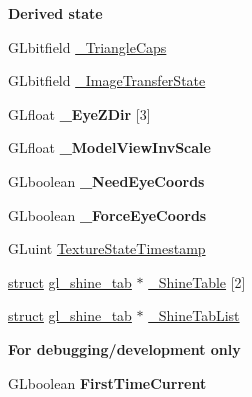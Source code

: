 \begin{Indent}\textbf{ Derived state}\par
\begin{DoxyCompactItemize}
\item 
G\+Lbitfield \hyperlink{structgl__context_a81c0ab96452f8d97b7dfe0171cef0d11}{\+\_\+\+Triangle\+Caps}
\item 
G\+Lbitfield \hyperlink{structgl__context_a864d2d1285eb6fc23f92f7f6cd14336d}{\+\_\+\+Image\+Transfer\+State}
\item 
\mbox{\label{structgl__context_ad4c0b56e8374404b7b71f515af6b0a04}} 
G\+Lfloat {\bfseries \+\_\+\+Eye\+Z\+Dir} \mbox{[}3\mbox{]}
\item 
\mbox{\label{structgl__context_a336f9f00751cf7b5518de6f015337296}} 
G\+Lfloat {\bfseries \+\_\+\+Model\+View\+Inv\+Scale}
\item 
\mbox{\label{structgl__context_aef9515ac7c38d0a000bac381222c09da}} 
G\+Lboolean {\bfseries \+\_\+\+Need\+Eye\+Coords}
\item 
\mbox{\label{structgl__context_a2a4c07d17607c7cc3a2b7af7d230783b}} 
G\+Lboolean {\bfseries \+\_\+\+Force\+Eye\+Coords}
\item 
G\+Luint \hyperlink{structgl__context_ac8146a34f7767c6158be080769804ef1}{Texture\+State\+Timestamp}
\item 
\hyperlink{interfacestruct}{struct} \hyperlink{structgl__shine__tab}{gl\+\_\+shine\+\_\+tab} $\ast$ \hyperlink{structgl__context_a9e0baca009841a823b60862edbefc5ac}{\+\_\+\+Shine\+Table} \mbox{[}2\mbox{]}
\item 
\hyperlink{interfacestruct}{struct} \hyperlink{structgl__shine__tab}{gl\+\_\+shine\+\_\+tab} $\ast$ \hyperlink{structgl__context_abe2ee6aaa885199a12ebdb6135e8045c}{\+\_\+\+Shine\+Tab\+List}
\end{DoxyCompactItemize}
\end{Indent}
\begin{Indent}\textbf{ For debugging/development only}\par
\begin{DoxyCompactItemize}
\item 
\mbox{\label{structgl__context_a711e3884b8ac1710b98cbdf592f1e4c2}} 
G\+Lboolean {\bfseries First\+Time\+Current}
\end{DoxyCompactItemize}
\end{Indent}
